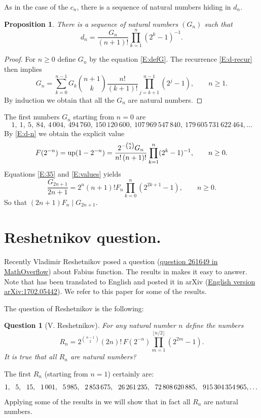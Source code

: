 \documentclass[10pt]{amsart}
\newtheorem{prop}[thm]{Proposition}
\newtheorem{quest}[thm]{Question}
\theoremstyle{definition}
\theoremstyle{remark}
\def\nn{\mskip12mu}
\begin{document}
As in the case of the $c_n$, there is a sequence of natural numbers hiding in
$d_n$.

\begin{prop}
There is a sequence of natural numbers $(G_n)$ such that
\begin{equation}\label{E:defG}
d_n=\frac{G_n}{(n+1)!}\prod_{k=1}^n(2^k-1)^{-1}.
\end{equation}
\end{prop}

\begin{proof}
For $n\ge0$ define $G_n$ by the equation \eqref{E:defG}. The recurrence \eqref{E:d-recur}
then implies
\[G_n=\sum_{k=0}^{n-1}G_k\binom{n+1}{k}\frac{n!}{(k+1)!}\prod_{j={k+1}}^{n-1}(2^j-1),\qquad n\ge1.\]
By induction we obtain that all the $G_n$ are natural numbers.
\end{proof}
The first numbers $G_n$ starting from $n=0$ are
\[1,\  1,\  5,\  84,\  4\,004,\   494\,760,\   150\,120\,600,\   107\,969\,547\,840,\   179\,605\,731\,622\,464, \dots\]
By \eqref{E:d-n} we obtain the explicit value
\begin{equation}\label{E:values}
F(2^{-n})=\operatorname{up}(1-2^{-n})=\frac{2^{-\binom{n}{2}}G_n}{n!\,(n+1)!}\prod_{k=1}^{n}(2^k-1)^{-1},\qquad n\ge0.
\end{equation}
Equations \eqref{E:35} and \eqref{E:values} yields
\begin{equation}
\frac{G_{2n+1}}{2n+1}=2^n (n+1)! F_n\prod_{k=0}^n(2^{2k+1}-1),\qquad n\ge0.
\end{equation}
So that $(2n+1)F_n\mid G_{2n+1}$.





\section{Reshetnikov question.}


Recently Vladimir Reshetnikov posed a  question (\href{http://mathoverflow.net/questions/261649/a-conjecture-about-certain-values-of-the-fabius-function}{question 261649
in MathOverflow}) about Fabius function. The results in \cite{MR666839} makes it easy
to answer. Note that \cite{MR666839} has been translated to English
and posted it in arXiv (\href{http://arxiv.org/abs/1702.05442}{English version arXiv:1702.05442}).
We refer
to this paper for some of the results.

The question of Reshetnikov  is
the following:

\begin{quest}[V. Reshetnikov]
For any natural number $n$ define the numbers
\begin{equation}\label{D:R}
R_n=2^{\binom{n-1}{2}}(2n)!\,F(2^{-n})\prod_{m=1}^{\lfloor n/2\rfloor}(2^{2m}-1).
\end{equation}
It is true that all $R_n$ are natural numbers?
\end{quest}
The first  $R_n$ (starting from $n=1$) certainly are:
\[1,\nn 5,\nn 15,\nn 1\,001,\nn 5\,985,\nn 2\,853\,675,\nn 26\,261\,235,\nn 72\,808\,620\,885,\nn 915\,304\,354\,965,\dots\]
Applying some of the results in \cite{MR666839} we will show that in fact all $R_n$ are
natural numbers.
\end{document}
